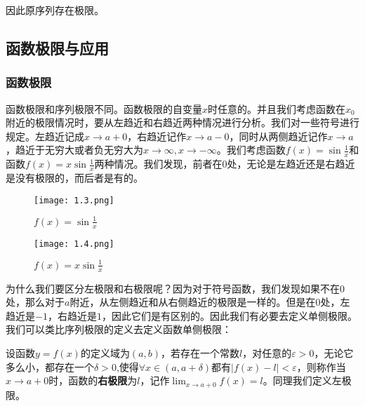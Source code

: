 \documentclass{ctexart}
\let\oldtextbf\textbf %
\renewcommand{\textbf}[1]{\textcolor{btex}{\oldtextbf{#1}}} %
\begin{document}
因此原序列存在极限。

\subsection{函数极限与应用}
\subsubsection{函数极限}
函数极限和序列极限不同。函数极限的自变量$x$时任意的。并且我们考虑函数在$x_0$附近的极限情况时，要从左趋近和右趋近两种情况进行分析。我们对一些符号进行规定。左趋近记成$x\to a+0$，右趋近记作$x\to a-0$，同时从两侧趋近记作$x\to a$，趋近于无穷大或者负无穷大为$x\to\infty,x\to -\infty$。我们考虑函数$f(x)=\sin\frac{1}{x}$和函数$f(x)=x\sin \frac{1}{x}$两种情况。我们发现，前者在0处，无论是左趋近还是右趋近是没有极限的，而后者是有的。
\begin{figure}[H]    
\centering     
\renewcommand{\figurename}{图}     
\renewcommand{\thefigure}{1.3}    
\begin{myimagebox}[width=0.4\textwidth] %
\texttt{[image: 1.3.png]} %
\end{myimagebox}     
\caption{\label{fig:1.3}$f(x)=\sin\frac{1}{x}$}   
\end{figure}
\begin{figure}[H]    
\centering     
\renewcommand{\figurename}{图}     
\renewcommand{\thefigure}{1.4}    
\begin{myimagebox}[width=0.4\textwidth] %
\texttt{[image: 1.4.png]} %
\end{myimagebox}     
\caption{\label{fig:1.4}$f(x)=x\sin\frac{1}{x}$}   
\end{figure}

为什么我们要区分左极限和右极限呢？因为对于符号函数，我们发现如果不在0处，那么对于$a$附近，从左侧趋近和从右侧趋近的极限是一样的。但是在0处，左趋近是$-1$，右趋近是$1$，因此它们是有区别的。因此我们有必要去定义单侧极限。我们可以类比序列极限的定义去定义函数单侧极限：
\begin{tcolorbox}[
    colback=bac2,     %
    colframe=fra2,   %
    coltitle=white,             %
    coltext=tex2,
    title=函数单侧极限,
    fonttitle=\bfseries,        %
arc=3mm,                     %
breakable
]
设函数$y=f(x)$的定义域为$(a,b)$，若存在一个常数$l$，对任意的$\varepsilon>0$，无论它多么小，都存在一个$\delta>0$,使得$\forall x\in(a,a+\delta)$都有$|f(x)-l|<\varepsilon$，则称作当$x\to a+0$时，函数的\textbf{\color{btex}右极限}为$l$，记作$\lim_{x\to a+0}f(x)=l$。同理我们定义左极限。
\end{tcolorbox}
\end{document}
